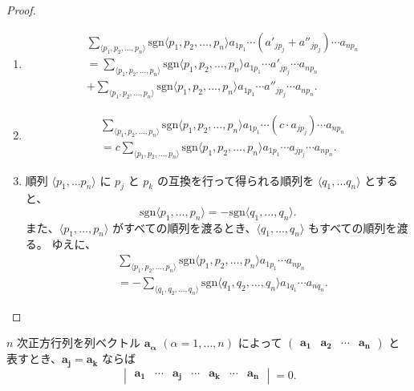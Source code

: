 \begin{proof}
  \begin{enumerate}
    \item
      \begin{align*}
        & \sum_{\langle p_1,p_2,\ldots,p_n\rangle}\mathrm{sgn}\langle p_1,p_2,\ldots,p_n\rangle a_{1 p_1}\cdots(a'_{j p_{j}}+a''_{j p_{j}})\cdots a_{n p_n} \\
        &=\sum_{\langle p_1,p_2,\ldots,p_n\rangle}\mathrm{sgn}\langle p_1,p_2,\ldots,p_n\rangle a_{1 p_1}\cdots a'_{j p_{j}}\cdots a_{n p_n} \\
        &+\sum_{\langle p_1,p_2,\ldots,p_n\rangle}\mathrm{sgn}\langle p_1,p_2,\ldots,p_n\rangle a_{1 p_1}\cdots a''_{j p_{j}}\cdots a_{n p_n}.
      \end{align*}
    \item
      \begin{align*}
        & \sum_{\langle p_1,p_2,\ldots,p_n\rangle}\mathrm{sgn}\langle p_1,p_2,\ldots,p_n\rangle a_{1 p_1}\cdots(c\cdot a_{j p_{j}})\cdots a_{n p_n} \\
        &=c\sum_{\langle p_1,p_2,\ldots,p_n\rangle}\mathrm{sgn}\langle p_1,p_2,\ldots,p_n\rangle a_{1 p_1}\cdots a_{j p_{j}}\cdots a_{n p_n}.
      \end{align*}
    \item 順列 \(\langle p_1,\ldots p_n\rangle\) に \(p_j\) と \(p_k\) の互換を行って得られる順列を \(\langle q_1,\ldots q_n\rangle\) とすると、
    \[\mathrm{sgn}\langle p_1,\ldots,p_n\rangle=-\mathrm{sgn}\langle q_1,\ldots,q_n\rangle.\]
    また、\(\langle p_1,\ldots,p_n\rangle\) がすべての順列を渡るとき、\(\langle q_1,\ldots,q_n\rangle\) もすべての順列を渡る。
    ゆえに、
      \begin{align*}
        & \sum_{\langle p_1,p_2,\ldots,p_n\rangle}\mathrm{sgn}\langle p_1,p_2,\ldots,p_n\rangle a_{1 p_1}\cdots a_{n p_n} \\
        &=-\sum_{\langle q_1,q_2,\ldots,q_n\rangle}\mathrm{sgn}\langle q_1,q_2,\ldots,q_n\rangle a_{1 q_1}\cdots a_{n q_n}.
      \end{align*}
  \end{enumerate}
\end{proof}

\begin{thm}\label{251219003501}
  \(n\) 次正方行列を列ベクトル \(\bm{a_\alpha}\) \((\alpha=1,\ldots,n)\) によって \(
    \begin{pmatrix}
      \bm{a_1} & \bm{a_2} & \cdots &\bm{a_n}
    \end{pmatrix}
  \) と表すとき、\(\bm{a_j}=\bm{a_k}\) ならば
  \[
    \begin{vmatrix}
      \bm{a_{1}} & \cdots & \bm{a_j} & \cdots & \bm{a_k} & \cdots & \bm{a_n}
    \end{vmatrix}
    =0.
  \]
\end{thm}

